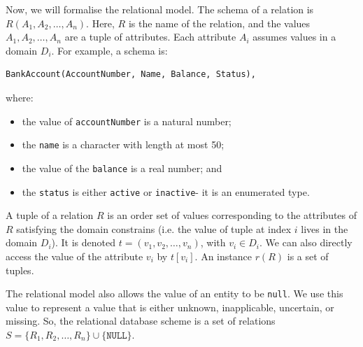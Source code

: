 \documentclass[a4paper, openany]{memoir}
\begin{document}
Now, we will formalise the relational model. The schema of a relation is $R(A_1, A_2, \dots, A_n)$. Here, $R$ is the name of the relation, and the values $A_1, A_2, \dots, A_n$ are a tuple of attributes. Each attribute $A_i$ assumes values in a domain $D_i$. For example, a schema is: 
\begin{verbatim}
BankAccount(AccountNumber, Name, Balance, Status),
\end{verbatim}
where:
\begin{itemize}
    \item the value of \texttt{accountNumber} is a natural number;
    \item the \texttt{name} is a character with length at most 50;
    \item the value of the \texttt{balance} is a real number; and
    \item the \texttt{status} is either \texttt{active} or \texttt{inactive}- it is an enumerated type.
\end{itemize}

A tuple of a relation $R$ is an order set of values corresponding to the attributes of $R$ satisfying the domain constrains (i.e. the value of tuple at index $i$ lives in the domain $D_i$). It is denoted $t = (v_1, v_2, \dots, v_n)$, with $v_i \in D_i$. We can also directly access the value of the attribute $v_i$ by $t[v_i]$. An instance $r(R)$ is a set of tuples.

The relational model also allows the value of an entity to be \texttt{null}. We use this value to represent a value that is either unknown, inapplicable, uncertain, or missing. So, the relational database scheme is a set of relations $S = \{R_1, R_2, \dots, R_n\} \cup \{\texttt{NULL}\}$.

\end{document}
